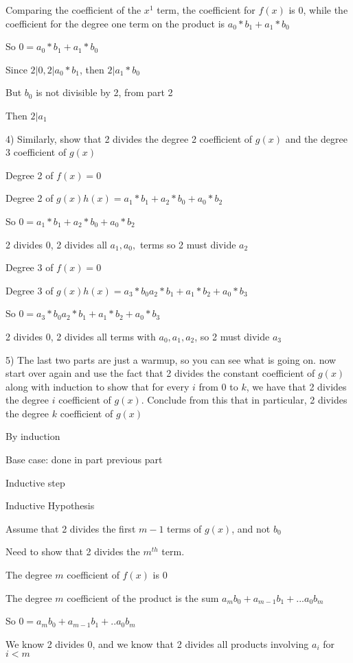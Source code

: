 \documentclass[12pt]{article}
\begin{document}
\begin{itemize}
Comparing the coefficient of the $x^1$ term, the coefficient for $f(x)$ is 0, while the coefficient for the degree one term on the product is $a_0*b_1 + a_1*b_0$

So $0 = a_0 * b_1 + a_1*b_0$

Since $2|0, 2|a_0*b_1$, then $2|a_1 * b_0$

But $b_0$ is not divisible by 2, from part 2

Then $2|a_1$

4) Similarly, show that 2 divides the degree 2 coefficient of $g(x)$ and the degree 3 coefficient of $g(x)$

Degree 2 of $f(x) = 0$

Degree 2 of $g(x)h(x) = a_1*b_1 + a_2 * b_0 + a_0 * b_2$

So $0 = a_1 *b_1 + a_2 * b_0 + a_0 * b_2$

2 divides 0, 2 divides all $a_1, a_0,$ terms so 2 must divide $a_2$

Degree 3 of $f(x) = 0$

Degree 3 of $g(x)h(x) = a_3*b_0 a_2*b_1 + a_1 * b_2 + a_0 * b_3$

So $0 = a_3*b_0 a_2*b_1 + a_1 * b_2 + a_0 * b_3$

2 divides 0, 2 divides all terms with $a_0, a_1, a_2$, so 2 must divide $a_3$

5) The last two parts are just a warmup, so you can see what is going on. now start over again and use the fact that 2 divides the constant coefficient of $g(x)$ along with induction to show that for every $i$ from 0 to $k$, we have that 2 divides the degree $i$ coefficient of $g(x)$. Conclude from this that in particular, 2 divides the degree $k$ coefficient of $g(x)$

By induction

Base case: done in part previous part

Inductive step

Inductive Hypothesis

Assume that 2 divides the first $m-1$ terms of $g(x)$, and not $b_0$

Need to show that 2 divides the $m^{th}$ term. 

The degree $m$ coefficient of $f(x)$ is 0

The degree $m$ coefficient of the product is the sum $a_m b_0 + a_{m-1} b_1 +... a_0 b_m$

So $0 = a_m b_0 + a_{m-1} b_1 + .. a_0b_m$

We know 2 divides 0, and we know that 2 divides all products involving $a_i$ for $i < m$


\end{itemize}
\end{document}
